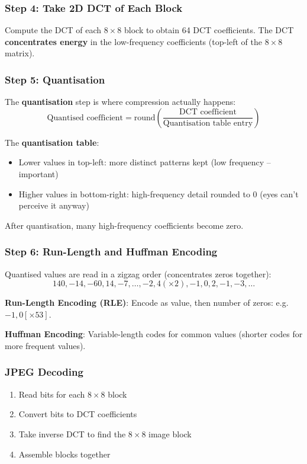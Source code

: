 \documentclass[12pt,a4paper]{article}
\begin{document}
\subsubsection{Step 4: Take 2D DCT of Each Block}

Compute the DCT of each $8\times8$ block to obtain 64 DCT coefficients. The DCT \textbf{concentrates energy} in the low-frequency coefficients (top-left of the $8\times8$ matrix).

\subsubsection{Step 5: Quantisation}

The \textbf{quantisation} step is where compression actually happens:
\[
  \text{Quantised coefficient} = \mathrm{round}\!\left(\frac{\text{DCT coefficient}}{\text{Quantisation table entry}}\right)
\]

The \textbf{quantisation table}:
\begin{itemize}
  \item Lower values in top-left: more distinct patterns kept (low frequency -- important)
  \item Higher values in bottom-right: high-frequency detail rounded to 0 (eyes can't perceive it anyway)
\end{itemize}

After quantisation, many high-frequency coefficients become zero.

\subsubsection{Step 6: Run-Length and Huffman Encoding}

Quantised values are read in a zigzag order (concentrates zeros together):
\[
  140, -14, -60, 14, -7, \ldots, -2, 4(\times2), -1, 0, 2, -1, -3, \ldots
\]

\textbf{Run-Length Encoding (RLE)}: Encode as value, then number of zeros: e.g.\ $-1, 0[\times53]$.

\textbf{Huffman Encoding}: Variable-length codes for common values (shorter codes for more frequent values).

\subsubsection{JPEG Decoding}
\begin{enumerate}
  \item Read bits for each $8\times8$ block
  \item Convert bits to DCT coefficients
  \item Take inverse DCT to find the $8\times8$ image block
  \item Assemble blocks together
\end{enumerate}
\end{document}
